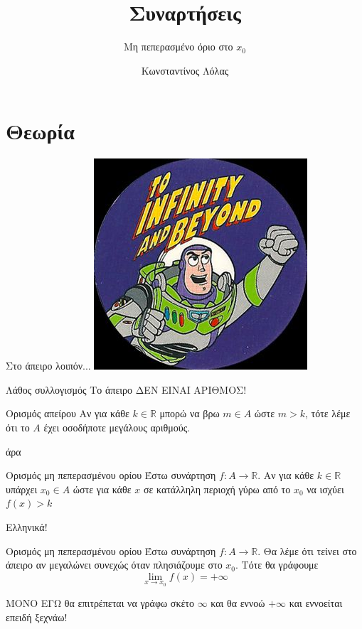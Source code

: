 \documentclass{presentation}
\title{Συναρτήσεις}
\subtitle{Μη πεπερασμένο όριο στο $x_0$}
\author[Λόλας]{Κωνσταντίνος Λόλας}
\institute[$10^ο$ ΓΕΛ]{$10^ο$ ΓΕΛ Θεσσαλονίκης}
\begin{document}
\begin{frame}
  \titlepage
\end{frame}

\section{Θεωρία}

\begin{frame}{Στο άπειρο λοιπόν...}
  \centering
  \includegraphics[height=0.6\columnwidth]{images/buzz}
\end{frame}

\begin{frame}{Λάθος συλλογισμός}
  Το άπειρο ΔΕΝ ΕΙΝΑΙ ΑΡΙΘΜΟΣ! \pause
  \begin{block}{Ορισμός απείρου}
    Αν για κάθε $k\in\mathbb{R}$ μπορώ να βρω $m\in Α$ ώστε $m>k$, τότε λέμε ότι το $Α$ έχει οσοδήποτε μεγάλους αριθμούς.
  \end{block} \pause
  άρα
  \begin{block}{Ορισμός μη πεπερασμένου ορίου}
    Έστω συνάρτηση $f:Α\to\mathbb{R}$. Αν για κάθε $k\in\mathbb{R}$ υπάρχει $x_0\in Α$ ώστε για κάθε $x$ σε κατάλληλη περιοχή γύρω από το $x_0$ να ισχύει $f(x)>k$
  \end{block}
\end{frame}

\begin{frame}{Ελληνικά!}
  \begin{block}{Ορισμός μη πεπερασμένου ορίου}
    Έστω συνάρτηση $f:Α\to\mathbb{R}$. Θα λέμε ότι τείνει στο άπειρο αν μεγαλώνει συνεχώς όταν πλησιάζουμε στο $x_0$. Τότε θα γράφουμε
    $$\lim\limits_{x \to x_0}{ f(x) }=+\infty$$
  \end{block} \pause
  ΜΟΝΟ ΕΓΩ θα επιτρέπεται να γράφω σκέτο $\infty$ και θα εννοώ $+\infty$ και εννοείται επειδή ξεχνάω!
\end{frame}
\end{document}

